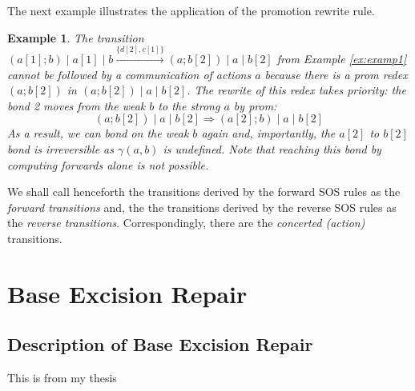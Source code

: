 \documentclass[review]{elsarticle}
\newcommand{\paral}{\; \vert \;}
\newcommand{\Comment}[1]{}
\newcommand{\rulename}[1]{\textsf{#1}}
\newtheorem{example}{Example}
\begin{document}
\Comment{
\Stefan{Our approach for prioritising transitions is different from approaches using predicates in the premises of the SOS rules, as 

suggested for example in \cite{Cleaveland2001711}. In our case we decided for a different approach since we need to prioritise rewrite rules as well as SOS rules.}
}
The next example illustrates the application of the promotion rewrite rule.
\begin{example}\label{example4}
{\rm The transition 
$(a[1];b) \paral a[1] \paral  b \xrightarrow{\{d[2], \underline{c}[1]\}} (a;b[2])\paral a \paral b[2]$ 
from Example \ref{ex:examp1} cannot be followed by a communication of actions $a$ because there
is a \rulename{prom} redex $(a;b[2])$ in $(a;b[2])\paral a \paral b[2]$. The rewrite of this redex takes 
priority: the bond 2 moves from the weak $b$ to the strong $a$ by \rulename{prom}:
$$(a;b[2])\paral a \paral b[2] \Rightarrow (a[2];b)\paral a \paral b[2] $$
As a result, we can bond on the weak $b$ again and, importantly, the $a[2]$ to $b[2]$ bond is irreversible
as $\gamma(a,b)$ is undefined. Note that reaching
this bond by computing forwards alone is not possible.}
\end{example}

We shall call henceforth the transitions derived by the forward SOS rules as the \emph{forward transitions} 
and, the the transitions derived by the reverse SOS rules as the \emph{reverse transitions}.
Correspondingly, there are the \emph{concerted (action)} transitions. 

\section{Base Excision Repair}
\label{sec:ber}

\subsection{Description of Base Excision Repair}

This is from my thesis
\end{document}
